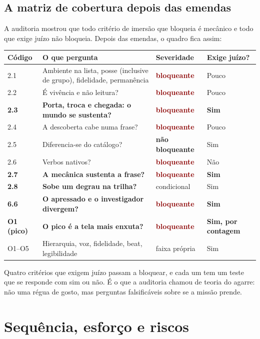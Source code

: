 \documentclass[11pt,a4paper]{article}
\newcommand{\bloq}{\textcolor{DarkRed}{\textbf{bloqueante}}}
\newcommand{\naobloq}{\textcolor{DarkYellow}{\textbf{não bloqueante}}}
\begin{document}
\subsection{A matriz de cobertura depois das emendas}

A auditoria mostrou que todo critério de imersão que bloqueia é mecânico e todo que exige juízo
não bloqueia. Depois das emendas, o quadro fica assim:

\begin{center}\small
\begin{tabular}{@{}p{1.6cm} p{6.4cm} p{2.6cm} p{2.2cm}@{}}
\toprule
\textbf{Código} & \textbf{O que pergunta} & \textbf{Severidade} & \textbf{Exige juízo?} \\
\midrule
2.1 & Ambiente na lista, posse (inclusive de grupo), fidelidade, permanência & \bloq & Pouco \\
2.2 & É vivência e não leitura? & \bloq & Pouco \\
\textbf{2.3} & \textbf{Porta, troca e chegada: o mundo se sustenta?} & \bloq & \textbf{Sim} \\
2.4 & A descoberta cabe numa frase? & \bloq & Pouco \\
2.5 & Diferencia-se do catálogo? & \naobloq & Sim \\
2.6 & Verbos nativos? & \bloq & Não \\
\textbf{2.7} & \textbf{A mecânica sustenta a frase?} & \bloq & \textbf{Sim} \\
\textbf{2.8} & \textbf{Sobe um degrau na trilha?} & condicional & Sim \\
\textbf{6.6} & \textbf{O apressado e o investigador divergem?} & \bloq & \textbf{Sim} \\
\textbf{O1 (pico)} & \textbf{O pico é a tela mais enxuta?} & \bloq & \textbf{Sim, por contagem} \\
O1--O5 & Hierarquia, voz, fidelidade, beat, legibilidade & faixa própria & Sim \\
\bottomrule
\end{tabular}
\end{center}

Quatro critérios que exigem juízo passam a bloquear, e cada um tem um teste que se responde com
sim ou não. É o que a auditoria chamou de teoria do agarre: não uma régua de gosto, mas
perguntas falsificáveis sobre se a missão prende.

\section{Sequência, esforço e riscos}
\end{document}
